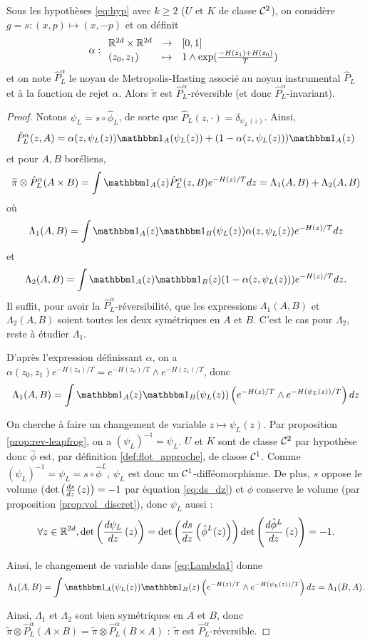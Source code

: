 \documentclass[10pt,a4paper]{article}
\begin{document}
\begin{Prop}[réversibilité]\label{prop:rever_discret}
	Sous les hypothèses \eqref{eq:hyp} avec $k \geq 2$ ($U$ et $K$ de classe $\mathcal{C}^2$), on considère $g = s : (x, p) \mapsto (x,-p)$ et on définit
	$$
	\alpha : { \begin{array}{lcl} 
	\mathbb{R}^{2d} \times \mathbb{R}^{2d} & \to & [0,1] \\
	(z_0, z_1) & \mapsto & 1 \wedge \exp(\frac{-H(z_1)+H(z_0)}{T})
	 \end{array} }
	$$
	et on note $\hat P_L^\alpha$ le noyau de Metropolis-Hasting associé au noyau instrumental $\hat P_L$ et à la fonction de rejet $\alpha$. Alors $\widetilde \pi$ est $\hat P_L^\alpha$-réversible (et donc $\hat P_L^\alpha$-invariant). 
\end{Prop}
\begin{proof}
	Notons $\psi_L = s \circ \hat \phi_L$, de sorte que $\hat P_L(z,\cdot) = \delta_{\psi_L(z)}$. Ainsi,
	$$
	\hat P_L^\alpha(z,A) = \alpha(z,\psi_L(z)) \ind_A(\psi_L(z)) + (1-\alpha(z,\psi_L(z))) \ind_A(z)
	$$
	et pour $A,B$ boréliens,
	$$
	\widetilde \pi \otimes \hat P_L^\alpha (A \times B)
	=
	\int \ind_A(z) \hat P_L^\alpha(z,B) e^{-H(z)/T} dz
	=
	\Lambda_1(A,B) + \Lambda_2(A,B)
	$$
	où
	$$
	\Lambda_1(A,B) = \int \ind_A(z) \ind_B(\psi_L(z)) \alpha(z,\psi_L(z)) e^{-H(z)/T} dz
	$$
	et
	$$
	\Lambda_2(A,B) = \int \ind_A(z) \ind_B(z) (1-\alpha(z,\psi_L(z))) e^{-H(z)/T} dz.
	$$
	Il suffit, pour avoir la $\hat P_L^\alpha$-réversibilité, que les expressions $\Lambda_1(A,B)$ et $\Lambda_2(A,B)$ soient toutes les deux symétriques en $A$ et $B$. C'est le cas pour $\Lambda_2$, reste à étudier $\Lambda_1$.

	D'après l'expression définissant $\alpha$, on a $\alpha(z_0,z_1) e^{-H(z_0)/T} = e^{-H(z_0)/T} \wedge e^{-H(z_1)/T}$, donc
	\begin{equation}\label{eq:Lambda1}
	\Lambda_1(A,B) = \int \ind_A(z) \ind_B(\psi_L(z)) \left( e^{-H(z)/T} \wedge e^{-H(\psi_L(z))/T} \right) dz
	\end{equation}

	On cherche à faire un changement de variable $z \mapsto \psi_L(z)$. Par proposition \ref{prop:rev-leapfrog}, on a $(\psi_L)^{-1} = \psi_L$. $U$ et $K$ sont de classe $\mathcal{C}^2$ par hypothèse donc $\hat \phi$ est, par définition \ref{def:flot_approche}, de classe $\mathcal{C}^1$. Comme $(\psi_L)^{-1} = \psi_L = s \circ \hat \phi^L$, $\psi_L$ est donc un $\mathcal{C}^1$-difféomorphisme. De plus, $s$ oppose le volume ($\det \left( \frac{d s}{d z} \left( z \right) \right) = -1$ par équation \eqref{eq:ds_dz}) et $\hat \phi$ conserve le volume (par proposition \ref{prop:vol_discret}), donc $\psi_L$ aussi :
	$$
	\forall z \in \mathbb{R}^{2d}, \det \left( \frac{d \psi_L}{d z} \left( z \right) \right) = \det \left( \frac{d s}{d z} \left( \hat \phi^L(z) \right) \right) \det \left( \frac{d \hat \phi^L}{d z} \left( z \right) \right) = -1.
	$$

	Ainsi, le changement de variable dans \eqref{eq:Lambda1} donne
	$$
	\Lambda_1(A,B) = \int \ind_A(\psi_L(z)) \ind_B(z) \left( e^{-H(z)/T} \wedge e^{-H(\psi_L(z))/T} \right) dz = \Lambda_1(B,A).
	$$

	Ainsi, $\Lambda_1$ et $\Lambda_2$ sont bien symétriques en $A$ et $B$, donc $\widetilde \pi \otimes \hat P_L^\alpha (A \times B) = \widetilde \pi \otimes \hat P_L^\alpha (B \times A)$ : $\widetilde \pi$ est $\hat P_L^\alpha$-réversible.
\end{proof}
\end{document}
